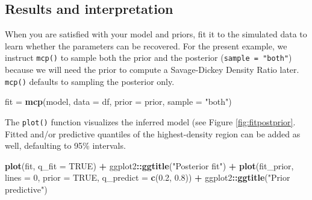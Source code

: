 \documentclass[
  american,
]{article}
\newenvironment{Shaded}{\begin{snugshade}}{\end{snugshade}}
\newcommand{\DataTypeTok}[1]{\textcolor[rgb]{0.13,0.29,0.53}{#1}}
\newcommand{\DecValTok}[1]{\textcolor[rgb]{0.00,0.00,0.81}{#1}}
\newcommand{\FloatTok}[1]{\textcolor[rgb]{0.00,0.00,0.81}{#1}}
\newcommand{\KeywordTok}[1]{\textcolor[rgb]{0.13,0.29,0.53}{\textbf{#1}}}
\newcommand{\NormalTok}[1]{#1}
\newcommand{\OperatorTok}[1]{\textcolor[rgb]{0.81,0.36,0.00}{\textbf{#1}}}
\newcommand{\OtherTok}[1]{\textcolor[rgb]{0.56,0.35,0.01}{#1}}
\newcommand{\StringTok}[1]{\textcolor[rgb]{0.31,0.60,0.02}{#1}}
\begin{document}
\hypertarget{results-and-interpretation}{%
\subsection{Results and interpretation}\label{results-and-interpretation}}

When you are satisfied with your model and priors, fit it to the simulated data to learn whether the parameters can be recovered. For the present example, we instruct \texttt{mcp()} to sample both the prior and the posterior (\texttt{sample\ =\ "both"}) because we will need the prior to compute a Savage-Dickey Density Ratio later. \texttt{mcp()} defaults to sampling the posterior only.

\begin{Shaded}
\begin{Highlighting}[]
\NormalTok{fit =}\StringTok{ }\KeywordTok{mcp}\NormalTok{(model, }\DataTypeTok{data =}\NormalTok{ df, }\DataTypeTok{prior =}\NormalTok{ prior, }\DataTypeTok{sample =} \StringTok{"both"}\NormalTok{)}
\end{Highlighting}
\end{Shaded}

The \texttt{plot()} function visualizes the inferred model (see Figure \ref{fig:fitpostprior}. Fitted and/or predictive quantiles of the highest-density region can be added as well, defaulting to 95\% intervals.



\begin{Shaded}
\begin{Highlighting}[]
\KeywordTok{plot}\NormalTok{(fit, }\DataTypeTok{q_fit =} \OtherTok{TRUE}\NormalTok{) }\OperatorTok{+}\StringTok{ }
\StringTok{  }\NormalTok{ggplot2}\OperatorTok{::}\KeywordTok{ggtitle}\NormalTok{(}\StringTok{"Posterior fit"}\NormalTok{) }\OperatorTok{+}
\StringTok{  }
\KeywordTok{plot}\NormalTok{(fit_prior, }\DataTypeTok{lines =} \DecValTok{0}\NormalTok{, }\DataTypeTok{prior =} \OtherTok{TRUE}\NormalTok{, }\DataTypeTok{q_predict =} \KeywordTok{c}\NormalTok{(}\FloatTok{0.2}\NormalTok{, }\FloatTok{0.8}\NormalTok{)) }\OperatorTok{+}\StringTok{ }
\StringTok{  }\NormalTok{ggplot2}\OperatorTok{::}\KeywordTok{ggtitle}\NormalTok{(}\StringTok{"Prior predictive"}\NormalTok{)}
\end{Highlighting}
\end{Shaded}
\end{document}
